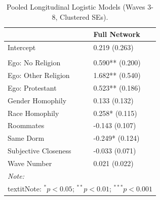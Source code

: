 \begin{table}

\caption{\label{tab:pooled-reg}Pooled Longitudinal Logistic Models (Waves 3-8, Clustered SEs).}
\centering
\begin{tabular}[t]{ll}
\toprule
  & Full Network\\
\midrule
Intercept & 0.219 (0.263)\\
 \\ 
Ego: No Religion & 0.590** (0.200)\\
Ego: Other Religion & 1.682** (0.540)\\
Ego: Protestant & 0.523** (0.186)\\
Gender Homophily & 0.133 (0.132)\\
\addlinespace
Race Homophily & 0.258* (0.115)\\
Roommates & -0.143 (0.107)\\
Same Dorm & -0.249* (0.124)\\
Subjective Closeness & -0.033 (0.071)\\
Wave Number & 0.021 (0.022)\\
\bottomrule
\multicolumn{2}{l}{\rule{0pt}{1em}\textit{Note: }}\\
\multicolumn{2}{l}{\rule{0pt}{1em}textit{Note:} $^{*} p < 0.05$; $^{**} p < 0.01$; $^{***} p < 0.001$}\\
\end{tabular}
\end{table}